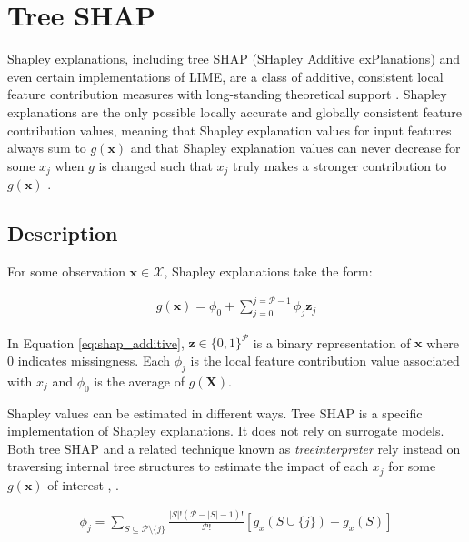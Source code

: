 \documentclass[sigconf, review]{acmart}
\begin{document}
\section{Tree SHAP} \label{sec:shap}

Shapley explanations, including tree SHAP (SHapley Additive exPlanations) and even certain implementations of LIME, are a class of additive, consistent local feature contribution measures with long-standing theoretical support \cite{shapley}. Shapley explanations are the only possible locally accurate and globally consistent feature contribution values, meaning that Shapley explanation values for input features always sum to $g(\mathbf{x})$ and that Shapley explanation values can never decrease for some $x_j$ when $g$ is changed such that $x_j$ truly makes a stronger contribution to $g(\mathbf{x})$ \cite{shapley}. 

\subsection{Description}

For some observation $\mathbf{x} \in \mathcal{X}$, Shapley explanations take the form:

\begin{equation}
\label{eq:shap_additive}
\begin{aligned}
g(\mathbf{x}) = \phi_0 + \sum_{j=0}^{j=\mathcal{P} - 1} \phi_j \mathbf{z}_j
\end{aligned}
\end{equation}

\noindent In Equation \ref{eq:shap_additive}, $\mathbf{z} \in \{0,1\}^\mathcal{P}$ is a binary representation of $\mathbf{x}$ where 0 indicates missingness. Each $\phi_j$ is the local feature contribution value associated with $x_j$ and $\phi_0$ is the average of $g(\mathbf{X})$. 

Shapley values can be estimated in different ways. Tree SHAP is a specific implementation of Shapley explanations. It does not rely on surrogate models. Both tree SHAP and a related technique known as \textit{treeinterpreter} rely instead on traversing internal tree structures to estimate the impact of each $x_j$ for some $g(\mathbf{x})$ of interest \cite{tree_shap}, \cite{treeinterpreter}.

\begin{equation}
\label{eq:shap_contrib}
\begin{aligned}
\phi_{j} = \sum_{S \subseteq \mathcal{P} \setminus \{j\}}\frac{|S|!(\mathcal{P} -|S| -1)!}{\mathcal{P}!}[g_x(S \cup \{j\}) - g_x(S)]
\end{aligned}
\end{equation}
\end{document}
